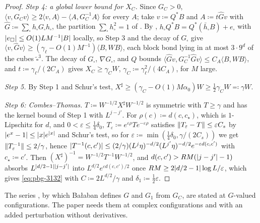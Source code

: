 \documentclass[11pt]{preprint}
\DeclarePairedDelimiter{\abs}{\lvert}{\rvert}
\DeclarePairedDelimiter{\norm}{\lVert}{\rVert}
\numberwithin{equation}{section}
\theoremstyle{definition}
\theoremstyle{remark}
\theoremstyle{plain}
\begin{document}
\begin{proof}
\emph{Step 4: a global lower bound for $X_C$.} Since $G_C > 0$, $\langle v, G_Cv\rangle \geq 2\langle v, A\rangle - \langle A, G_C^{-1}A\rangle$ for every $A$; take $v \coloneqq Q^*B$ and $A \coloneqq t\hat Gv$ with $\hat G \coloneqq \sum_\square h_\square G_\square h_\square$, the partition $\sum_\square h_\square^2 = 1$ of \cite[p.~408, l.~23]{BalabanPBG}. By \cite[(3.102)]{BalabanPBG}, $h_\square Q^*B = Q^*(\bar h_\square B) + e_\square$ with $\abs{e_\square} \leq O(1)LM^{-1}\abs B$ locally, so Step 3 and the decay of $G_\square$ give $\langle v, \hat Gv\rangle \geq (\gamma_\ell - O(1)M^{-1})\langle B, WB\rangle$, each block bond lying in at most $3 \cdot 9^d$ of the cubes $\tilde\square^3$. The decay of $G_\square$, $\nabla G_\square$, and $Q$ bounds $\langle\hat Gv, G_C^{-1}\hat Gv\rangle \leq C_A\langle B, WB\rangle$, and $t \coloneqq \gamma_\ell/(2C_A)$ gives $X_C \geq \gamma_CW$, $\gamma_C \coloneqq \gamma_\ell^2/(4C_A)$, for $M$ large.

\emph{Step 5.} By Step 1 and Schur's test, $X^\sharp \geq (\gamma_C - O(1)M\alpha_0)W \geq \frac12\gamma_CW \eqqcolon \gamma W$.

\emph{Step 6: Combes--Thomas.} $T \coloneqq W^{-1/2}X^\sharp W^{-1/2}$ is symmetric with $T \geq \gamma$ and has the kernel bound of Step 1 with $L^{j-j'}$. For $\rho(c) \coloneqq d(c, c_\star)$, which is $1$-Lipschitz for $d$, and $0 < \varepsilon \leq \frac14\delta_0$, $T_\varepsilon \coloneqq e^{\varepsilon\rho}Te^{-\varepsilon\rho}$ satisfies $\norm{T_\varepsilon - T} \leq \varepsilon C_s$ by $\abs{e^x - 1} \leq \abs xe^{\abs x}$ and Schur's test, so for $\varepsilon \coloneqq \min(\frac14\delta_0, \gamma/(2C_s))$ we get $\norm{T_\varepsilon^{-1}} \leq 2/\gamma$, hence $\abs{T^{-1}(c, c')} \leq (2/\gamma)(L^j\eta)^{-d/2}(L^{j'}\eta)^{-d/2}e^{-\varepsilon d(c,c')}$ with $c_\star \coloneqq c'$. Then $(X^\sharp)^{-1} = W^{-1/2}T^{-1}W^{-1/2}$, and $d(c, c') > RM(\abs{j - j'} - 1)$ absorbs $L^{\abs{d/2-1}\abs{j-j'}}$ into $L^{d/2}e^{\varepsilon d(c,c')/2}$ once $RM \geq 2\abs{d/2 - 1}\log L/\varepsilon$, which gives \eqref{eq:pbg-3132} with $C \coloneqq 2L^{d/2}/\gamma$ and $\delta_1 \coloneqq \frac12\varepsilon$.
\end{proof}

The series \cite[(3.130), (3.138)]{BalabanPBG}, by which Ba{\l}aban defines $G$ and $G_1$ from $G_C$, are stated at $G$-valued configurations. The paper needs them at complex configurations and with an added perturbation without derivatives.
\end{document}

